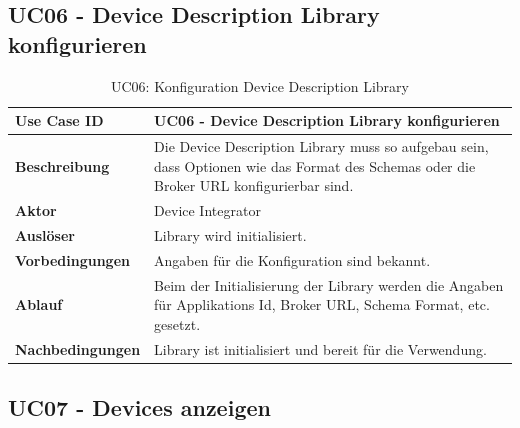 \subsection{UC06 - Device Description Library konfigurieren}
\begin{table}[H]
\begin{tabularx}{\textwidth}{|l|X|}

 \hline
 {\bf Use Case ID }    & UC06 - Device Description Library konfigurieren \\  \hline
 {\bf Beschreibung }   & Die Device Description Library muss so aufgebau sein, dass Optionen wie das Format des Schemas oder die Broker URL konfigurierbar sind.  \\ \hline
 {\bf Aktor }          & Device Integrator \\ \hline
 {\bf Auslöser }       & Library wird initialisiert. \\ \hline
 {\bf Vorbedingungen } & Angaben für die Konfiguration sind bekannt. \\ \hline
 {\bf Ablauf }         & Beim der Initialisierung der Library werden die Angaben für Applikations Id, Broker URL, Schema Format, etc. gesetzt. \\ \hline
 {\bf Nachbedingungen} & Library ist initialisiert und bereit für die Verwendung. \\ \hline
  
\end{tabularx}
\caption{UC06: Konfiguration Device Description Library}
\end{table}

\subsection{UC07 - Devices anzeigen}

